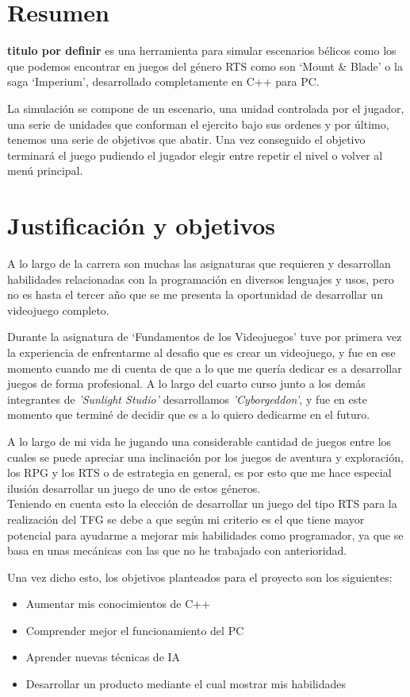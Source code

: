 \chapter*{Resumen}
\label{Resumen}
\textbf{titulo por definir} es una herramienta para simular escenarios 
 bélicos como los que podemos encontrar en juegos del género \ac{RTS} como son
 `Mount \& Blade' o la saga `Imperium', desarrollado completamente en C++ para \ac{PC}.

La simulación se compone de un escenario, una unidad controlada por el jugador,
una serie de unidades que conforman el ejercito bajo sus ordenes y por último, 
tenemos una serie de objetivos que abatir. Una vez conseguido el objetivo terminará
el juego pudiendo el jugador elegir entre repetir el nivel o volver al menú principal.

\chapter*{Justificación y objetivos}
A lo largo de la carrera son muchas las asignaturas que requieren y desarrollan
habilidades relacionadas con la programación en diversos lenguajes y usos, 
pero no es hasta el tercer año que se me presenta la oportunidad de desarrollar
un videojuego completo. 

Durante la asignatura de `Fundamentos de los Videojuegos' tuve por primera vez
la experiencia de enfrentarme al desafio que es crear un videojuego, y fue en ese
momento cuando me di cuenta de que a lo que me quería dedicar es a
desarrollar juegos de forma profesional. A lo largo del cuarto curso junto a los demás
integrantes de \textit{'Sunlight Studio'} desarrollamos \textit{'Cyborgeddon'}, y fue
en este momento que terminé de decidir que es a lo quiero dedicarme en el futuro.

A lo largo de mi vida he jugando una considerable cantidad de juegos entre los cuales
se puede apreciar una inclinación por los juegos de aventura y exploración, los 
\ac{RPG} y los \ac{RTS} o de estrategia en general, es por esto que me hace especial
ilusión desarrollar un juego de uno de estos géneros.\\
Teniendo en cuenta esto la elección de desarrollar un juego del tipo \ac{RTS} para la
realización del \ac{TFG} se debe a que según mi criterio es el que tiene mayor
potencial para ayudarme a mejorar mis habilidades como programador, ya que se basa en
unas mecánicas con las que no he trabajado con anterioridad.

Una vez dicho esto, los objetivos planteados para el proyecto son los siguientes:
\begin{itemize}
	\item Aumentar mis conocimientos de C++
	\item Comprender mejor el funcionamiento del \ac{PC}
	\item Aprender nuevas técnicas de \ac{IA}
	\item Desarrollar un producto mediante el cual mostrar mis habilidades
\end{itemize}


